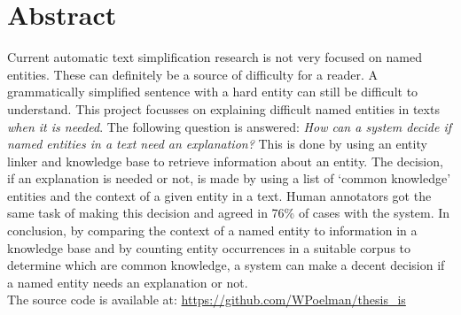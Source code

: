 \documentclass[
10pt, %
a4paper, %
oneside, %
headinclude,footinclude, %
] {book}%
\begin{document}

\chapter*{Abstract}


Current automatic text simplification research is not very focused on named entities.
These can definitely be a source of difficulty for a reader.
A grammatically simplified sentence with a hard entity can still be difficult to understand.
This project focusses on explaining difficult named entities in texts \textit{when it is needed}.
The following question is answered: \textit{How can a system decide if named entities in a text need an explanation?}
This is done by using an entity linker and knowledge base to retrieve information about an entity.
The decision, if an explanation is needed or not, is made by using a list of `common knowledge' entities and the context of a given entity in a text.
Human annotators got the same task of making this decision and agreed in 76\% of cases with the system.
In conclusion, by comparing the context of a named entity to information in a knowledge base and by counting entity occurrences in a suitable corpus to determine which are common knowledge, a system can make a decent decision if a named entity needs an explanation or not.\\

The source code is available at: \url{https://github.com/WPoelman/thesis_is}

%
\end{document}

